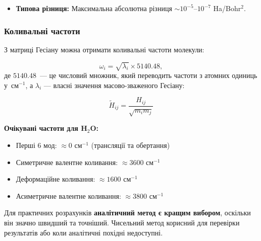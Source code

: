 {\begin{itemize}
    \item \textbf{Типова різниця:} Максимальна абсолютна різниця $\sim 10^{-5}$--$10^{-7}$ Ha/Bohr$^2$.
\end{itemize}

\subsubsection{Коливальні частоти}

З матриці Гесіану можна отримати коливальні частоти молекули:

\begin{equation}
    \omega_i = \sqrt{\lambda_i} \times 5140.48,
\end{equation}
де $5140.48$~--- це числовий множник, який переводить частоти з атомних одиниць у~см$^{-1}$, а $\lambda_i$ --- власні значення масово-зваженого Гесіану:

\begin{equation}
    \tilde{H}_{ij} = \frac{H_{ij}}{\sqrt{m_i m_j}}
\end{equation}

\noindent\textbf{Очікувані частоти для H$_2$O:}
\begin{itemize}
    \item Перші 6 мод: $\approx 0$ см$^{-1}$ (трансляції та обертання)
    \item Симетричне валентне коливання: $\approx 3600$ см$^{-1}$
    \item Деформаційне коливання: $\approx 1600$ см$^{-1}$
    \item Асиметричне валентне коливання: $\approx 3800$ см$^{-1}$
\end{itemize}

Для практичних розрахунків \textbf{аналітичний метод є кращим вибором}, оскільки він значно швидший та точніший. Чисельний метод корисний для перевірки результатів або коли аналітичні похідні недоступні.


}
